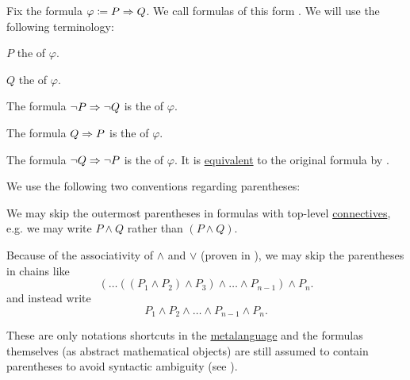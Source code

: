 \begin{definition}\label{def:material_implication}
  Fix the formula \( \varphi \coloneqq P \Rightarrow Q \). We call formulas of this form . We will use the following terminology:

  \begin{DefEnum}
     \( P \) the  of \( \varphi \).

     \( Q \) the  of \( \varphi \).

     The formula \( \neg P \Rightarrow \neg Q \) is the  of \( \varphi \).

     The formula \( Q \Rightarrow P \) is the  of \( \varphi \).

     The formula \( \neg Q \Rightarrow \neg P \) is the  of \( \varphi \). It is \hyperref[def:propositional_interpretation/equivalence]{equivalent} to the original formula by .
  \end{DefEnum}
\end{definition}

\begin{remark}\label{remark:propositional_formula_parentheses}
  We use the following two conventions regarding parentheses:
  \begin{RemEnum}
     We may skip the outermost parentheses in formulas with top-level \hyperref[def:propositional_alphabet/connectives]{connectives}, e.g. we may write \( P \wedge Q \) rather than \( (P \wedge Q) \).

     Because of the associativity of \( \wedge \) and \( \vee \) (proven in ), we may skip the parentheses in chains like
    \begin{equation*}
      ( \ldots ((P_1 \wedge P_2) \wedge P_3) \wedge \ldots \wedge P_{n-1} ) \wedge P_n.
    \end{equation*}
    and instead write
    \begin{equation*}
      P_1 \wedge P_2 \wedge \ldots \wedge P_{n-1} \wedge P_n.
    \end{equation*}
  \end{RemEnum}

  These are only notations shortcuts in the \hyperref[remark:metalanguage]{metalanguage} and the formulas themselves (as abstract mathematical objects) are still assumed to contain parentheses to avoid syntactic ambiguity (see ).
\end{remark}

